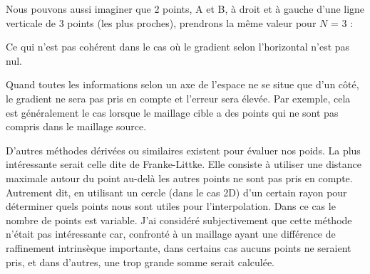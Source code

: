 Nous pouvons aussi imaginer que 2 points, A et B, à droit et à gauche d'une ligne verticale de 3 points (les plus proches), prendrons la même valeur pour \( N \) = 3 :

\begin{center}
\end{center}

    
Ce qui n'est pas cohérent dans le cas où le gradient selon l'horizontal n'est pas nul.

Quand toutes les informations selon un axe de l'espace ne se situe que d'un côté, le gradient ne sera pas pris en compte et l'erreur sera élevée. Par exemple, cela est généralement le cas lorsque le maillage cible a des points qui ne sont pas compris dans le maillage source.

D'autres méthodes dérivées ou similaires existent pour évaluer nos poids. La plus intéressante serait celle dite de Franke-Littke. Elle consiste à utiliser une distance maximale autour du point au-delà les autres points ne sont pas pris en compte. Autrement dit, en utilisant un cercle (dans le cas 2D) d'un certain rayon pour déterminer quels points nous sont utiles pour l'interpolation. Dans ce cas le nombre de points est variable.
J'ai considéré subjectivement que cette méthode n'était pas intéressante car, confronté à un maillage ayant une différence de raffinement intrinsèque importante, dans certains cas aucuns points ne seraient pris, et dans d'autres, une trop grande somme serait calculée.

